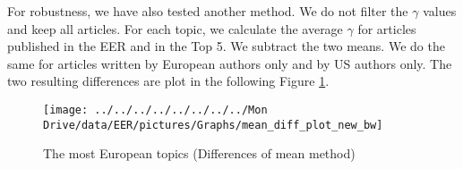 \documentclass[
  12pt,
  onecolumn]{article}
\begin{document}
For robustness, we have also tested another method. We do not filter the
\(\gamma\) values and keep all articles. For each topic, we calculate
the average \(\gamma\) for articles published in the EER and in the Top
5. We subtract the two means. We do the same for articles written by
European authors only and by US authors only. The two resulting
differences are plot in the following Figure
\ref{fig:plot-topic-diff-alternative}.

\begin{figure}[H]

{\centering \texttt{[image: ../../../../../../../../Mon Drive/data/EER/pictures/Graphs/mean\_diff\_plot\_new\_bw]} 

}

\caption{The most European topics (Differences of mean method)}\label{fig:plot-topic-diff-alternative}
\end{figure}
\end{document}
